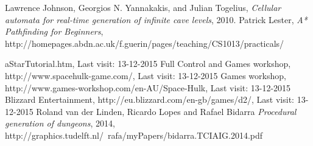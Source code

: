 \documentclass[conference,compsoc]{IEEEtran}
\begin{document}
%
%
%
\begin{thebibliography}{1}

Lawrence Johnson, Georgios N. Yannakakis, and Julian Togelius, \emph{Cellular automata for real-time generation
of infinite cave levels}, 2010.
Patrick Lester, \emph{A* Pathfinding for Beginners}, http://homepages.abdn.ac.uk/f.guerin/pages/teaching/CS1013/practicals/

aStarTutorial.htm, Last visit: 13-12-2015
Full Control and Games workshop, http://www.spacehulk-game.com/, Last visit: 13-12-2015
Games workshop, http://www.games-workshop.com/en-AU/Space-Hulk, Last visit: 13-12-2015
Blizzard Entertainment, http://eu.blizzard.com/en-gb/games/d2/, Last visit: 13-12-2015
Roland van der Linden, Ricardo Lopes and Rafael Bidarra
\emph{Procedural generation of dungeons}, 2014, http://graphics.tudelft.nl/~rafa/myPapers/bidarra.TCIAIG.2014.pdf
\end{thebibliography}
\end{document}
